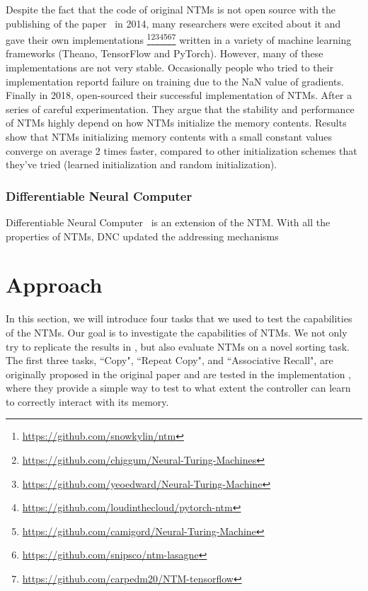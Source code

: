 \documentclass[12pt,twoside]{article}
\theoremstyle{plain}
\theoremstyle{definition}
\theoremstyle{remark}
\begin{document}
Despite the fact that the code of original NTMs is not open source with the publishing of the paper~\cite{original-ntm} in 2014, many researchers were excited about it and gave their own implementations
\footnote{\url{https://github.com/snowkylin/ntm}}\footnote{\url{https://github.com/chiggum/Neural-Turing-Machines}}\footnote{\url{https://github.com/yeoedward/Neural-Turing-Machine}}\footnote{\url{https://github.com/loudinthecloud/pytorch-ntm}}\footnote{\url{https://github.com/camigord/Neural-Turing-Machine}}\footnote{\url{https://github.com/snipsco/ntm-lasagne}}\footnote{\url{https://github.com/carpedm20/NTM-tensorflow}}
written in a variety of machine learning frameworks (Theano, TensorFlow and PyTorch). However, many of these implementations are not very stable. Occasionally people who tried to their implementation reportd failure on training due to the NaN value of gradients. Finally in 2018, \cite{implementing-ntm} open-sourced their successful implementation of NTMs. After a series of careful experimentation. They argue that the stability and performance of NTMs highly depend on how NTMs initialize the memory contents. Results show that NTMs initializing memory contents with a small constant values converge on average 2 times faster, compared to other initialization schemes that they've tried (learned initialization and random initialization).

\subsubsection{Differentiable Neural Computer}
Differentiable Neural Computer~\cite{original-dnc} is an extension of the NTM.
With all the properties of NTMs, DNC updated the addressing mechanisms 

\section{Approach}
In this section, we will introduce four tasks that we used to test the capabilities of the NTMs. Our goal is to investigate the capabilities of NTMs. We not only try to replicate the results in \cite{implementing-ntm}, but also evaluate NTMs on a novel sorting task. The first three tasks, ``Copy", ``Repeat Copy", and ``Associative Recall", are originally proposed in the original paper \cite{original-ntm} and are tested in the implementation \cite{implementing-ntm}, where they provide a simple way to test to what extent the controller can learn to correctly interact with its memory.
\end{document}
